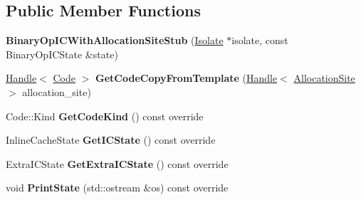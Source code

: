 \subsection*{Public Member Functions}
\begin{DoxyCompactItemize}
\item 
{\bfseries Binary\+Op\+I\+C\+With\+Allocation\+Site\+Stub} (\hyperlink{classv8_1_1internal_1_1_isolate}{Isolate} $\ast$isolate, const Binary\+Op\+I\+C\+State \&state)\hypertarget{classv8_1_1internal_1_1_binary_op_i_c_with_allocation_site_stub_a9b0ccf8d0ec45136dcfcb96cb839c6b9}{}\label{classv8_1_1internal_1_1_binary_op_i_c_with_allocation_site_stub_a9b0ccf8d0ec45136dcfcb96cb839c6b9}

\item 
\hyperlink{classv8_1_1internal_1_1_handle}{Handle}$<$ \hyperlink{classv8_1_1internal_1_1_code}{Code} $>$ {\bfseries Get\+Code\+Copy\+From\+Template} (\hyperlink{classv8_1_1internal_1_1_handle}{Handle}$<$ \hyperlink{classv8_1_1internal_1_1_allocation_site}{Allocation\+Site} $>$ allocation\+\_\+site)\hypertarget{classv8_1_1internal_1_1_binary_op_i_c_with_allocation_site_stub_aec94eb294037a617268907dfaa4cf87a}{}\label{classv8_1_1internal_1_1_binary_op_i_c_with_allocation_site_stub_aec94eb294037a617268907dfaa4cf87a}

\item 
Code\+::\+Kind {\bfseries Get\+Code\+Kind} () const  override\hypertarget{classv8_1_1internal_1_1_binary_op_i_c_with_allocation_site_stub_af1f2b6ccc020677a19a0f77ea59d2674}{}\label{classv8_1_1internal_1_1_binary_op_i_c_with_allocation_site_stub_af1f2b6ccc020677a19a0f77ea59d2674}

\item 
Inline\+Cache\+State {\bfseries Get\+I\+C\+State} () const  override\hypertarget{classv8_1_1internal_1_1_binary_op_i_c_with_allocation_site_stub_a3b3e03a2a2304e1f7f4fe7ffc52b77c3}{}\label{classv8_1_1internal_1_1_binary_op_i_c_with_allocation_site_stub_a3b3e03a2a2304e1f7f4fe7ffc52b77c3}

\item 
Extra\+I\+C\+State {\bfseries Get\+Extra\+I\+C\+State} () const  override\hypertarget{classv8_1_1internal_1_1_binary_op_i_c_with_allocation_site_stub_aa57100b2fc9b6bb0ee2d3c0993db1727}{}\label{classv8_1_1internal_1_1_binary_op_i_c_with_allocation_site_stub_aa57100b2fc9b6bb0ee2d3c0993db1727}

\item 
void {\bfseries Print\+State} (std\+::ostream \&os) const  override\hypertarget{classv8_1_1internal_1_1_binary_op_i_c_with_allocation_site_stub_adccea75e470724790d8be97407ac1425}{}\label{classv8_1_1internal_1_1_binary_op_i_c_with_allocation_site_stub_adccea75e470724790d8be97407ac1425}

\end{DoxyCompactItemize}

